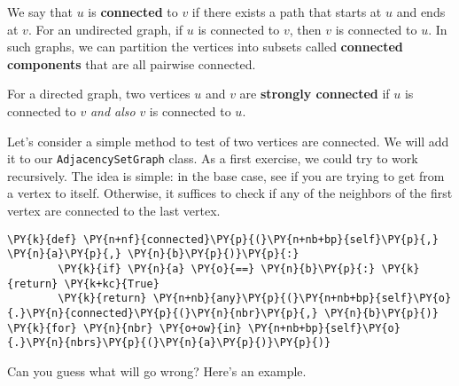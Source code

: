 We say that $u$ is \textbf{connected} to $v$ if there exists a path that starts at $u$ and ends at $v$.
For an undirected graph, if $u$ is connected to $v$, then $v$ is connected to $u$.
In such graphs, we can partition the vertices into subsets called \textbf{connected components} that are all pairwise connected.  


For a directed graph, two vertices $u$ and $v$ are \textbf{strongly connected} if $u$ is connected to $v$ \emph{and also} $v$ is connected to $u$.


Let's consider a simple method to test of two vertices are connected.
We will add it to our \texttt{AdjacencySetGraph} class.  As a first exercise, we could try to work recursively.  The idea is simple: in the base case, see if you are trying to get from a vertex to itself.  Otherwise, it suffices to check if any of the neighbors of the first vertex are connected to the last vertex.

\begin{Verbatim}[commandchars=\\\{\}]
    \PY{k}{def} \PY{n+nf}{connected}\PY{p}{(}\PY{n+nb+bp}{self}\PY{p}{,} \PY{n}{a}\PY{p}{,} \PY{n}{b}\PY{p}{)}\PY{p}{:}
        \PY{k}{if} \PY{n}{a} \PY{o}{==} \PY{n}{b}\PY{p}{:} \PY{k}{return} \PY{k+kc}{True}
        \PY{k}{return} \PY{n+nb}{any}\PY{p}{(}\PY{n+nb+bp}{self}\PY{o}{.}\PY{n}{connected}\PY{p}{(}\PY{n}{nbr}\PY{p}{,} \PY{n}{b}\PY{p}{)} \PY{k}{for} \PY{n}{nbr} \PY{o+ow}{in} \PY{n+nb+bp}{self}\PY{o}{.}\PY{n}{nbrs}\PY{p}{(}\PY{n}{a}\PY{p}{)}\PY{p}{)}
\end{Verbatim}



Can you guess what will go wrong?
Here's an example.

